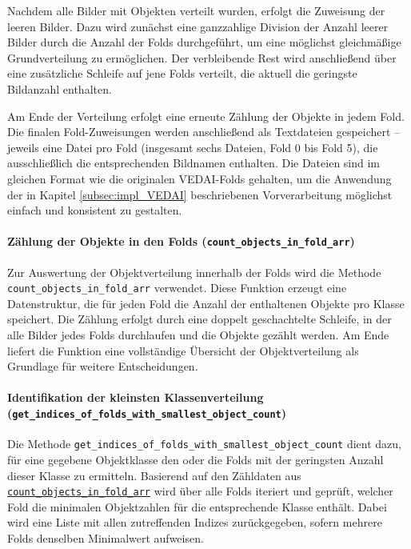 Nachdem alle Bilder mit Objekten verteilt wurden, erfolgt die Zuweisung der leeren Bilder. Dazu wird zunächst eine ganzzahlige Division der Anzahl leerer Bilder durch die Anzahl der Folds durchgeführt, um eine möglichst gleichmäßige Grundverteilung zu ermöglichen. Der verbleibende Rest wird anschließend über eine zusätzliche Schleife auf jene Folds verteilt, die aktuell die geringste Bildanzahl enthalten.

Am Ende der Verteilung erfolgt eine erneute Zählung der Objekte in jedem Fold. Die finalen Fold-Zuweisungen werden anschließend als Textdateien gespeichert – jeweils eine Datei pro Fold (insgesamt sechs Dateien, Fold 0 bis Fold 5), die ausschließlich die entsprechenden Bildnamen enthalten. Die Dateien sind im gleichen Format wie die originalen \acrshort{VEDAI}-Folds gehalten, um die Anwendung der in Kapitel \ref{subsec:impl_VEDAI} beschriebenen Vorverarbeitung möglichst einfach und konsistent zu gestalten.


\paragraph{Zählung der Objekte in den Folds (\lstinline|count_objects_in_fold_arr|)}
\hypertarget{par:count_objects_in_fold_arr}{}

Zur Auswertung der Objektverteilung innerhalb der Folds wird die Methode \lstinline|count_objects_in_fold_arr| verwendet. Diese Funktion erzeugt eine Datenstruktur, die für jeden Fold die Anzahl der enthaltenen Objekte pro Klasse speichert. Die Zählung erfolgt durch eine doppelt geschachtelte Schleife, in der alle Bilder jedes Folds durchlaufen und die Objekte gezählt werden. Am Ende liefert die Funktion eine vollständige Übersicht der Objektverteilung als Grundlage für weitere Entscheidungen.

\paragraph{Identifikation der kleinsten Klassenverteilung (\lstinline|get_indices_of_folds_with_smallest_object_count|)}
\hypertarget{par:get_indices_folds_with_smallest_object_count}{}

Die Methode \lstinline|get_indices_of_folds_with_smallest_object_count| dient dazu, für eine gegebene Objektklasse den oder die Folds mit der geringsten Anzahl dieser Klasse zu ermitteln. Basierend auf den Zähldaten aus \hyperlink{par:count_objects_in_fold_arr}{\lstinline|count_objects_in_fold_arr|} wird über alle Folds iteriert und geprüft, welcher Fold die minimalen Objektzahlen für die entsprechende Klasse enthält. Dabei wird eine Liste mit allen zutreffenden Indizes zurückgegeben, sofern mehrere Folds denselben Minimalwert aufweisen.

